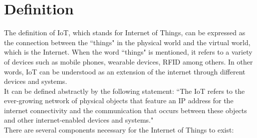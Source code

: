 \documentclass[11pt]{book}
\begin{document}
\section{Definition}
The definition of IoT, which stands for Internet of Things, can be expressed as the connection between the ``things" in the physical world and the virtual world, which is the Internet. When the word ``things" is mentioned, it refers to a variety of devices such as mobile phones, wearable devices, RFID among others. In other words, IoT can be understood as an extension of the internet through different devices and systems.\\
It can be defined abstractly by the following statement: ``The IoT refers to the ever-growing network of physical objects that feature an IP address for the internet connectivity and the communication that occurs between these objects and other internet-enabled devices and systems." \\
There are several components necessary for the Internet of Things to exist:
\end{document}
